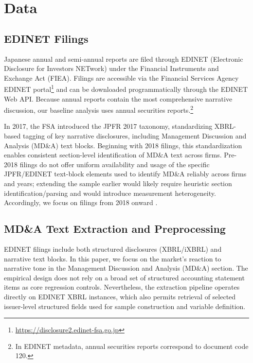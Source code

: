 \section{Data}
\label{sec:data}

\subsection{EDINET Filings}
\label{subsec:edinet}

Japanese annual and semi-annual reports are filed through EDINET (Electronic
Disclosure for Investors NETwork) under the Financial Instruments and Exchange Act (FIEA).
Filings are accessible via the Financial Services Agency EDINET portal\footnote{\url{https://disclosure2.edinet-fsa.go.jp}} and can be downloaded programmatically through the EDINET Web API. Because annual reports contain the most comprehensive narrative discussion, our baseline analysis uses annual securities reports.\footnote{In EDINET metadata, annual securities reports correspond to document code 120.}

In 2017, the FSA introduced the JPFR 2017 taxonomy, standardizing XBRL-based tagging of key narrative disclosures, including Management Discussion and Analysis (MD\&A) text blocks. Beginning with 2018 filings, this standardization enables consistent section-level identification of MD\&A text across firms. Pre-2018 filings do not offer uniform availability and usage of the specific JPFR/EDINET text-block elements used to identify MD\&A reliably across firms and years; extending the sample earlier would likely require heuristic section identification/parsing and would introduce measurement heterogeneity. Accordingly, we focus on filings from 2018 onward \citep{FSA2017taxonomy, FSA2018iXBRL}.

\subsection{MD\&A Text Extraction and Preprocessing}
EDINET filings include both structured disclosures (XBRL/iXBRL) and narrative text blocks. In this paper, we focus on the market’s reaction to narrative tone in the Management Discussion and Analysis (MD\&A) section. The empirical design does not rely on a broad set of structured accounting statement items as core regression controls. Nevertheless, the extraction pipeline operates directly on EDINET XBRL instances, which also permits retrieval of selected issuer-level structured fields used for sample construction and variable definition.

